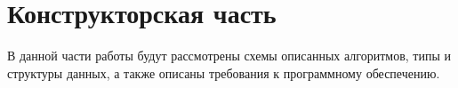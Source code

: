 
\chapter{Конструкторская часть}
В данной части работы будут рассмотрены схемы описанных алгоритмов, типы и структуры данных, а также описаны требования к программному обеспечению.


